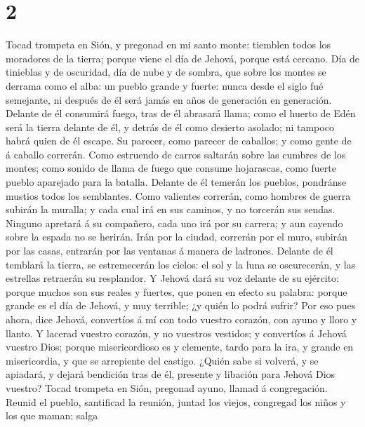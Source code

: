 \hypertarget{section-1}{%
\section{2}\label{section-1}}

 Tocad trompeta en Sión, y pregonad en mi santo monte:
tiemblen todos los moradores de la tierra; porque viene el día de
Jehová, porque está cercano.  Día de tinieblas y de
oscuridad, día de nube y de sombra, que sobre los montes se derrama como
el alba: un pueblo grande y fuerte: nunca desde el siglo fué semejante,
ni después de él será jamás en años de generación en generación.
 Delante de él consumirá fuego, tras de él abrasará llama;
como el huerto de Edén será la tierra delante de él, y detrás de él como
desierto asolado; ni tampoco habrá quien de él escape.  Su
parecer, como parecer de caballos; y como gente de á caballo correrán.
 Como estruendo de carros saltarán sobre las cumbres de los
montes; como sonido de llama de fuego que consume hojarascas, como
fuerte pueblo aparejado para la batalla.  Delante de él
temerán los pueblos, pondránse mustios todos los semblantes.
 Como valientes correrán, como hombres de guerra subirán la
muralla; y cada cual irá en sus caminos, y no torcerán sus sendas.
 Ninguno apretará á su compañero, cada uno irá por su
carrera; y aun cayendo sobre la espada no se herirán.  Irán
por la ciudad, correrán por el muro, subirán por las casas, entrarán por
las ventanas á manera de ladrones.  Delante de él temblará
la tierra, se estremecerán los cielos: el sol y la luna se oscurecerán,
y las estrellas retraerán su resplandor.  Y Jehová dará su
voz delante de su ejército: porque muchos son sus reales y fuertes, que
ponen en efecto su palabra: porque grande es el día de Jehová, y muy
terrible; ¿y quién lo podrá sufrir?  Por eso pues ahora,
dice Jehová, convertíos á mí con todo vuestro corazón, con ayuno y lloro
y llanto.  Y lacerad vuestro corazón, y no vuestros
vestidos; y convertíos á Jehová vuestro Dios; porque misericordioso es y
clemente, tardo para la ira, y grande en misericordia, y que se
arrepiente del castigo.  ¿Quién sabe si volverá, y se
apiadará, y dejará bendición tras de él, presente y libación para Jehová
Dios vuestro?  Tocad trompeta en Sión, pregonad ayuno,
llamad á congregación.  Reunid el pueblo, santificad la
reunión, juntad los viejos, congregad los niños y los que maman: salga
